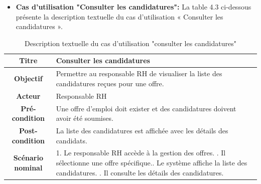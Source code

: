 \begin{itemize}
        \item \textbf{Cas d'utilisation "Consulter les candidatures": } La table 4.3 ci-dessous présente la description textuelle du cas d'utilisation « Consulter les candidatures ».
    \end{itemize}
    \begin{table}[H]
    \caption{ Description textuelle du cas d’utilisation "consulter les candidatures"}
    \centering
    \begin{tabular}{|c|p{12cm}|}
    \hline
    \textbf{Titre} & Consulter les candidatures \\
    \hline
    \textbf{Objectif} & Permettre au responsable RH de visualiser la liste des candidatures reçues pour une offre. \\
    \hline
    \textbf{Acteur}& Responsable RH\\
    \hline
    \textbf{Pré-condition} & Une offre d’emploi doit exister et des candidatures doivent avoir été soumises.
    \\
    \hline
    \textbf{Post-condition} & La liste des candidatures est affichée avec les détails des candidats.\\
    \hline
    \textbf{Scénario nominal} & 1. Le responsable RH accède à la gestion des offres. \newline
    2. Il sélectionne une offre spécifique.\newline
    3. Le système affiche la liste des candidatures.
    \newline
    4. Il consulte les détails des candidatures.\\
    \hline
    \end{tabular}
    \label{tab:user_stories}
\end{table}

